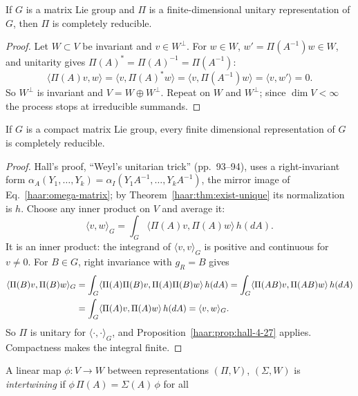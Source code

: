 \begin{proposition}\label{haar:prop:hall-4-27}
If $G$ is a matrix Lie group and $\Pi$ is a finite-dimensional unitary
representation of $G$, then $\Pi$ is completely reducible.
\end{proposition}
\begin{proof}
Let $W\subset V$ be invariant and $v\in W^\perp$. For $w\in W$,
$w'=\Pi(A^{-1})w\in W$, and unitarity gives
$\Pi(A)^*=\Pi(A)^{-1}=\Pi(A^{-1})$:
\begin{equation}
 \langle\Pi(A)v,w\rangle=\langle v,\Pi(A)^*w\rangle=\langle v,\Pi(A^{-1})w\rangle
 =\langle v,w'\rangle=0 .
\end{equation}
So $W^\perp$ is invariant and $V=W\oplus W^\perp$. Repeat on $W$ and
$W^\perp$; since $\dim V<\infty$ the process stops at irreducible summands.
\end{proof}
\begin{theorem}\label{haar:thm:hall-4-28}
If $G$ is a compact matrix Lie group, every finite dimensional
representation of $G$ is completely reducible.
\end{theorem}
\begin{proof}
Hall's proof, ``Weyl's unitarian trick'' (pp.~93--94), uses a
right-invariant form $\alpha_A(Y_1,\dots,Y_k)=\alpha_I(Y_1A^{-1},\dots,Y_kA^{-1})$,
the mirror image of Eq.~\eqref{haar:omega-matrix}; by
Theorem~\ref{haar:thm:exist-unique} its normalization is $h$. Choose any
inner product on $V$ and average it:
\begin{equation}\label{haar:unitarian-trick}
 \langle v,w\rangle_G=\int_G\langle\Pi(A)v,\Pi(A)w\rangle\,h(dA).
\end{equation}
It is an inner product: the integrand of $\langle v,v\rangle_G$ is positive
and continuous for $v\ne0$. For $B\in G$, right invariance with $g_R=B$ gives
\begin{align}
 \langle\Pi(B)v,\Pi(B)w\rangle_G
 &=\int_G\langle\Pi(A)\Pi(B)v,\Pi(A)\Pi(B)w\rangle\,h(dA)
 =\int_G\langle\Pi(AB)v,\Pi(AB)w\rangle\,h(dA)\notag\\
 &=\int_G\langle\Pi(A)v,\Pi(A)w\rangle\,h(dA)=\langle v,w\rangle_G .
\end{align}
So $\Pi$ is unitary for $\langle\cdot,\cdot\rangle_G$, and
Proposition~\ref{haar:prop:hall-4-27} applies. Compactness makes the integral
finite.
\end{proof}
A linear map $\phi\colon V\to W$ between representations $(\Pi,V)$,
$(\Sigma,W)$ is \emph{intertwining} if $\phi\,\Pi(A)=\Sigma(A)\,\phi$ for all
